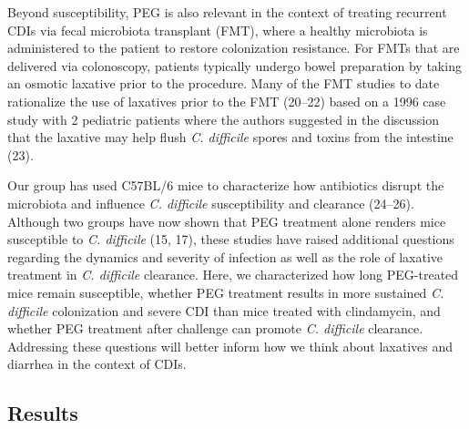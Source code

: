 \documentclass[
  11pt,
]{article}
\begin{document}
Beyond susceptibility, PEG is also relevant in the context of treating
recurrent CDIs via fecal microbiota transplant (FMT), where a healthy
microbiota is administered to the patient to restore colonization
resistance. For FMTs that are delivered via colonoscopy, patients
typically undergo bowel preparation by taking an osmotic laxative prior
to the procedure. Many of the FMT studies to date rationalize the use of
laxatives prior to the FMT (20--22) based on a 1996 case study with 2
pediatric patients where the authors suggested in the discussion that
the laxative may help flush \emph{C. difficile} spores and toxins from
the intestine (23).

Our group has used C57BL/6 mice to characterize how antibiotics disrupt
the microbiota and influence \emph{C. difficile} susceptibility and
clearance (24--26). Although two groups have now shown that PEG
treatment alone renders mice susceptible to \emph{C. difficile} (15,
17), these studies have raised additional questions regarding the
dynamics and severity of infection as well as the role of laxative
treatment in \emph{C. difficile} clearance. Here, we characterized how
long PEG-treated mice remain susceptible, whether PEG treatment results
in more sustained \emph{C. difficile} colonization and severe CDI than
mice treated with clindamycin, and whether PEG treatment after challenge
can promote \emph{C. difficile} clearance. Addressing these questions
will better inform how we think about laxatives and diarrhea in the
context of CDIs.

\hypertarget{results}{%
\subsection{Results}\label{results}}
\end{document}
